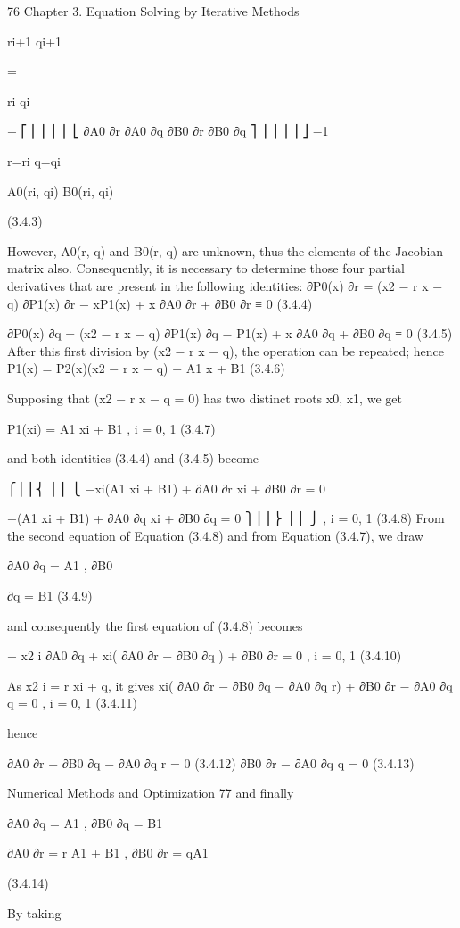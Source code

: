 \documentclass[letterpaper,12pt]{article}
\begin{document}
76 Chapter 3. Equation Solving by Iterative Methods


ri+1
qi+1

=

ri
qi

−
⎡
⎢
⎢
⎢
⎢
⎣
∂A0
∂r
∂A0
∂q ∂B0
∂r
∂B0
∂q
⎤
⎥
⎥
⎥
⎥
⎦
−1

r=ri q=qi

A0(ri, qi)
B0(ri, qi)


(3.4.3)

However, A0(r, q) and B0(r, q) are unknown, thus the elements of the Jacobian matrix
also. Consequently, it is necessary to determine those four partial derivatives that are
present in the following identities:
∂P0(x)
∂r = (x2 − r x − q)
∂P1(x)
∂r − xP1(x) + x
∂A0
∂r +
∂B0
∂r ≡ 0 (3.4.4)

∂P0(x)
∂q = (x2 − r x − q)
∂P1(x)
∂q − P1(x) + x
∂A0
∂q
+
∂B0
∂q ≡ 0 (3.4.5)
After this first division by (x2 − r x − q), the operation can be repeated; hence
P1(x) = P2(x)(x2 − r x − q) + A1 x + B1 (3.4.6)

Supposing that (x2 − r x − q = 0) has two distinct roots x0, x1, we get

P1(xi) = A1 xi + B1 , i = 0, 1 (3.4.7)

and both identities (3.4.4) and (3.4.5) become

⎧⎪⎪⎨
⎪⎪
⎩
−xi(A1 xi + B1) + ∂A0
∂r xi + ∂B0
∂r = 0

−(A1 xi + B1) + ∂A0
∂q xi + ∂B0
∂q = 0
⎫⎪⎪⎬
⎪⎪
⎭
, i = 0, 1 (3.4.8)
From the second equation of Equation (3.4.8) and from Equation (3.4.7), we draw

∂A0
∂q = A1 , ∂B0

∂q = B1 (3.4.9)

and consequently the first equation of (3.4.8) becomes

− x2
i
∂A0
∂q
+ xi(
∂A0
∂r − ∂B0
∂q
) +
∂B0
∂r = 0 , i = 0, 1 (3.4.10)

As x2
i = r xi + q, it gives
xi(
∂A0
∂r − ∂B0
∂q − ∂A0
∂q r) +
∂B0
∂r − ∂A0
∂q
q = 0 , i = 0, 1 (3.4.11)

hence

∂A0
∂r − ∂B0
∂q − ∂A0
∂q r = 0 (3.4.12)
∂B0
∂r − ∂A0
∂q
q = 0 (3.4.13)

Numerical Methods and Optimization 77
and finally

∂A0
∂q = A1 , ∂B0
∂q = B1

∂A0
∂r = r A1 + B1 , ∂B0
∂r = qA1

(3.4.14)

By taking
\end{document}
